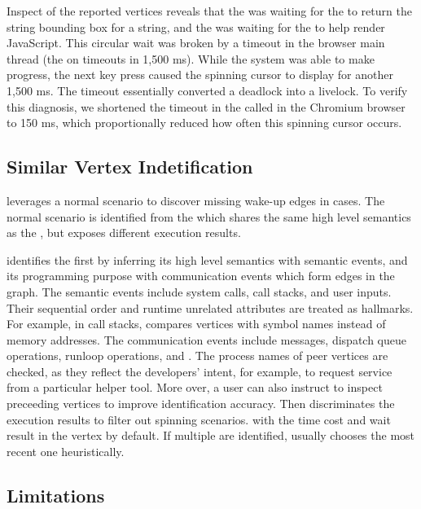 Inspect of the reported vertices reveals that the  was waiting
for the  to return the string bounding box for a string, and the
 was waiting for the  to help render JavaScript.
This circular wait was broken by a timeout in the browser main thread (the
 on  timeouts in 1,500 ms). While the system
was able to make progress, the next key press caused the spinning cursor to
display for another 1,500 ms. The timeout essentially converted a deadlock
into a livelock. To verify this diagnosis, we shortened the timeout in the
 called in the Chromium browser to 150 ms, which
proportionally reduced how often this spinning cursor occurs.

\subsection{Similar Vertex Indetification}\label{subsec:similarvertex}

\xxx leverages a normal scenario to discover missing wake-up edges in 
cases. The normal scenario is identified from the \similarnode which shares
the same high level semantics as the \spinningnode, but exposes different
execution results.

\xxx identifies the \similarnodes first by inferring its high level semantics
with semantic events, and its programming purpose with communication events
which form edges in the graph. The semantic events include system calls, call
stacks, and user inputs. Their sequential order and runtime unrelated attributes
are treated as hallmarks. For example, in call stacks, \xxx compares vertices
with symbol names instead of memory addresses. The communication events include
messages, dispatch queue operations, runloop operations, \dataflagread and
\dataflagwrite. The process names of peer vertices are checked, as they reflect
the developers' intent, for example, to request service from a particular
helper tool. More over, a user can also instruct \xxx to inspect preceeding
vertices to improve identification accuracy. Then \xxx discriminates the
execution results to filter out spinning scenarios.  with the time cost and
wait result in the vertex by default. If multiple \similarnodes are identified,
\xxx usually chooses the most recent one heuristically.

\subsection{Limitations}


